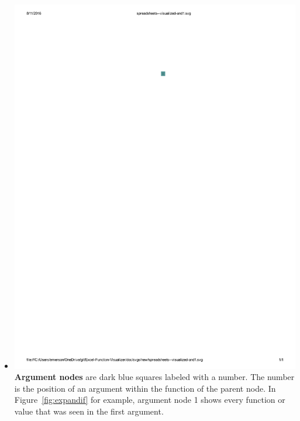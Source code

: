 \documentclass[conference]{IEEEtran}
\begin{document}
\begin{itemize}
		\item  \vspace{.15cm} \includegraphics{glossary-blue} \textbf{Argument nodes}
		are dark blue squares labeled with a number. The number is the position of an
		argument within the function of the parent node. In Figure~\ref{fig:expandif}
		for example, argument node 1 shows every function or value that was seen in
		the first argument.
		

\end{itemize}
\end{document}
